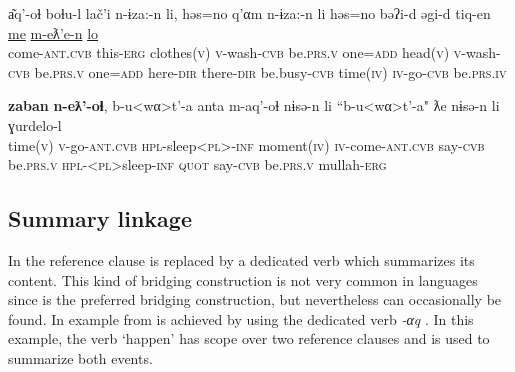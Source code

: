 \documentclass[output=paper]{LSP/langsci}
\begin{document}
\begin{exe}
	\ex	\label{ex:16ab}
	\begin{xlist}
		\ex	\label{ex:16a}
		\gll	a͂q'-oɬ					boɬu-l		lač'i			n-ɨza:-n			li,				həs=no		q'αm n-ɨza:-n			li				həs=no		bəʔi-d		əgi-d				tiq-en \underline{me}		\underline{m-eƛ'e-n}		\underline{lo} \\
			come-\textsc{ant.cvb}	this-\textsc{erg}	clothes(\textsc{v})	\textsc{v}-wash-\textsc{cvb}	be.\textsc{prs.v}		one=\textsc{add}		head(\textsc{v}) \textsc{v}-wash-\textsc{cvb}	be.\textsc{prs.v}		one=\textsc{add}		here-\textsc{dir}	there-\textsc{dir}		be.busy-\textsc{cvb} time(\textsc{iv})	\textsc{iv}-go-\textsc{cvb}	be.\textsc{prs.iv}\\
		\glt	{}

		\ex	\label{ex:16b}
		\gll	\textbf{zaban}		\textbf{n-eƛ'-oɬ},			b-u<wα>t'-a			anta				m-aq'-oɬ nɨsə-n	li				``b-u<wα>t'-a"		ƛe			nɨsə-n	li				ɣurdelo-l\\
			time(\textsc{v})	\textsc{v}-go-\textsc{ant.cvb}		\textsc{hpl}-sleep<\textsc{pl}>-\textsc{inf}	 moment(\textsc{iv})	\textsc{iv}-come-\textsc{ant.cvb} say-\textsc{cvb}	be.\textsc{prs.v}		\textsc{hpl}-<\textsc{pl}>sleep-\textsc{inf}	\textsc{quot}		say-\textsc{cvb}	be.\textsc{prs.v}		mullah-\textsc{erg}
\\
		\glt	{} 
	\end{xlist}
\end{exe}

\subsection{Summary linkage}
\label{sec:Summary linkage}
In  the reference clause is replaced by a dedicated verb which summarizes its content. This kind of bridging construction is not very common in  languages since  is the preferred bridging construction, but nevertheless can occasionally be found.
In example  from   is achieved by using the dedicated verb \textit{-αq} . In this example, the verb ‘happen’ has scope over two reference clauses and is used to summarize both events.
\end{document}
